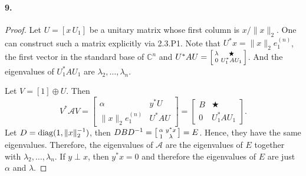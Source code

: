   \paragraph{9.}
  \begin{proof}
    Let $U=[x\,U_1]$ be a unitary matrix whose first column is $x/\|x\|_2$. One
    can construct such a matrix explicitly via 2.3.P1. Note that $U^*x=\|x\|_2
    e^{(n)}_1$, the first vector in the standard base of $\mathbb{C}^n$ and 
    $U^*AU=\begin{bsmallmatrix}\lambda & \bigstar \\ 0 & U_1^*AU_1
    \end{bsmallmatrix}$. And the eigenvalues of $U_1^*AU_1$ are $\lambda_2,
    \dots,\lambda_n$.\par
    Let $V=[1]\oplus U$. Then
    \[
      V^*\mathcal{A}V = 
      \begin{bmatrix}
        \alpha    & y^*U \\
        \|x\|_2e^{(n)}_1 & U^*AU 
      \end{bmatrix} =
      \begin{bmatrix}
        B & \bigstar \\ 
        0 & U_1^*AU_1
      \end{bmatrix}.
    \]
    Let $D=\operatorname{diag}(1,\|x\|_2^{-1})$, then $DBD^{-1}=\begin{bsmallmatrix}
    \alpha & y^*x \\ 1 & \lambda\end{bsmallmatrix}=E$. Hence, they have the same
    eigenvalues. Therefore, the eigenvalues of $\mathcal{A}$ are the eigenvalues
    of $E$ together with $\lambda_2,\dots,\lambda_n$. If $y\perp x$, then $y^*x=
    0$ and therefore the eigenvalues of $E$ are just $\alpha$ and $\lambda$.
  \end{proof}

